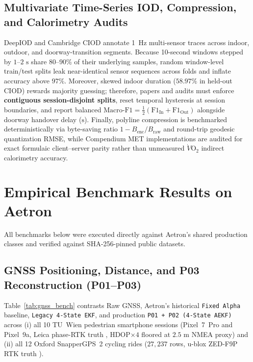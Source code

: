 \documentclass[journal]{IEEEtran}
\begin{document}
\subsection{Multivariate Time-Series IOD, Compression, and Calorimetry Audits}
DeepIOD \cite{dastagir2024deepiod} and Cambridge CIOD \cite{bakirtzis2022ciod} annotate 1~Hz multi-sensor traces across indoor, outdoor, and doorway-transition segments. Because 10-second windows stepped by $1\text{--}2\text{ s}$ share $80\text{--}90\%$ of their underlying samples, random window-level train/test splits leak near-identical sensor sequences across folds and inflate accuracy above $97\%$. Moreover, skewed indoor duration ($58.97\%$ in held-out CIOD) rewards majority guessing; therefore, papers and audits must enforce \textbf{contiguous session-disjoint splits}, reset temporal hysteresis at session boundaries, and report balanced $\text{Macro-F1} = \frac{1}{2}(\mathrm{F1}_{\text{In}} + \mathrm{F1}_{\text{Out}})$ alongside doorway handover delay ($\text{s}$). Finally, polyline compression is benchmarked deterministically via byte-saving ratio $1 - B_{\text{enc}}/B_{\text{raw}}$ and round-trip geodesic quantization RMSE, while Compendium MET implementations \cite{herrmann2024compendium} are audited for exact formulaic client--server parity rather than unmeasured $\dot{V}\text{O}_2$ indirect calorimetry accuracy.

\section{Empirical Benchmark Results on Aetron}

All benchmarks below were executed directly against Aetron's shared production classes and verified against SHA-256-pinned public datasets.

\subsection{GNSS Positioning, Distance, and P03 Reconstruction (P01--P03)}
Table~\ref{tab:gnss_bench} contrasts Raw GNSS, Aetron's historical \texttt{Fixed Alpha} baseline, \texttt{Legacy 4-State EKF}, and production \texttt{P01 + P02 (4-State AEKF)} across (i) all 10 TU~Wien pedestrian smartphone sessions (Pixel~7~Pro and Pixel~9a, Leica phase-RTK truth \cite{tuwien2025dataset}, HDOP$\times 4$ floored at $2.5\text{ m}$ NMEA proxy) and (ii) all 12 Oxford SnapperGPS~2 cycling rides ($27{,}237$ rows, u-blox ZED-F9P RTK truth \cite{beuchert2023snappergps}).
\end{document}
